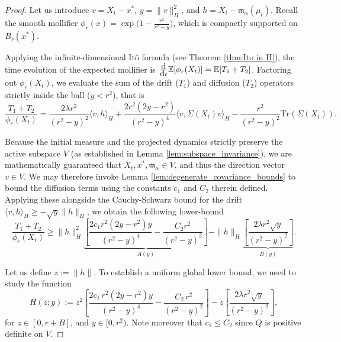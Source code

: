 \documentclass[12pt]{amsart}
\newcommand{\D}[1]{\mbox{\rm #1}}
\newcommand{\dd}{\D{d}}
\numberwithin{equation}{section}
\begin{document}
\begin{proof}

Let us introduce $v = X_t - x^*$,  $y = \|v\|_H^2$, and  $h = X_t - \mathfrak{m}_{\alpha}(\mu_t)$. Recall the smooth mollifier $\phi_r(x) = \exp\big(1 - \frac{r^2}{r^2 - y}\big)$, which is compactly supported on $B_r(x^*)$.  

Applying the infinite-dimensional It\^o formula (see Theorem \ref{thm:Ito in H}), the time evolution of the expected mollifier is $\frac{\dd}{\dd t} \mathbb{E}[\phi_r(X_t)] = \mathbb{E}[T_1 + T_2]$. Factoring out $\phi_r(X_t)$, we evaluate the sum of the drift ($T_1$) and diffusion ($T_2$) operators strictly inside the ball ($y < r^2$), that is
\begin{equation} \label{eq:full_operator_deg}
    \frac{T_1 + T_2}{\phi_r(X_t)} = \frac{2\lambda r^2}{(r^2-y)^2} \langle v, h \rangle_H + \frac{2r^2(2y - r^2)}{(r^2-y)^4} \langle v, \Sigma(X_t) v \rangle_H - \frac{r^2}{(r^2-y)^2} \mathrm{Tr}(\Sigma(X_t)).
\end{equation}

Because the initial measure and the projected dynamics strictly preserve the active subspace $V$ (as established in Lemma \ref{lem:subspace_invariance}), we are mathematically guaranteed that $X_t, x^*, \mathfrak{m}_\alpha \in V$, and thus the direction vector $v \in V$. We may therefore invoke Lemma \ref{lem:degenerate_covariance_bounds} to bound the diffusion terms using the constants $c_1$ and $C_2$ therein defined. Applying these alongside the Cauchy-Schwarz bound for the drift $\langle v, h \rangle_H \geq -\sqrt{y}\|h\|_H$, we obtain the following lower-bound
\begin{equation*}
    \frac{T_1 + T_2}{\phi_r(X_t)} \geq \|h\|_H^2 \underbrace{ \left[ \frac{2 c_1 r^2 (2y - r^2) y}{(r^2-y)^4} - \frac{C_2 r^2}{(r^2-y)^2} \right] }_{A(y)} - \|h\|_H \underbrace{ \left[ \frac{2\lambda r^2 \sqrt{y}}{(r^2-y)^2} \right] }_{B(y)}.
\end{equation*}

Let us define $z:= \|h\|$. To establish a uniform global lower bound, we need to study the function
\begin{equation*}
    H(z;y)
    := z^{2} \left[ \frac{2c_{1}\, r^{2} (2y - r^{2})y}{(r^{2} -y)^4} - \frac{C_{2}\, r^{2}}{(r^{2} - y)^2} \right]
    - z \left[\frac{2 \lambda r^{2} \sqrt{y}}{(r^{2} - y)^2}\right],
\end{equation*}
for $z\in[0, r+B]$, and $y\in[0,r^2)$. Note moreover that $c_1\leq C_2$ since $Q$ is positive definite on $V$. 



\end{proof}
\end{document}
